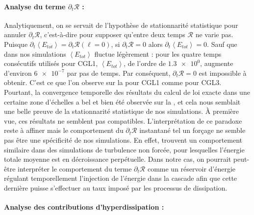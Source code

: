  \paragraph{Analyse du terme \ensuremath{\partial_t \mathcal{R}} :  } 
  Analytiquement, on se servait de l'hypothèse de stationnarité statistique pour annuler $\partial_t \mathcal{R}$, c'est-à-dire pour supposer qu'entre deux temps $\mathcal{R}$ ne varie pas. Puisque $\partial_t \left<E_{tot}\right>=\partial_t \mathcal{R}(\boldsymbol{\ell} = 0)$, si $\partial_t \mathcal{R}=0$ alors $\partial_t \left<E_{tot}\right>=0$.  Sauf que dans nos simulations $\left<E_{tot}\right>$ fluctue légèrement : pour les quatre temps consécutifs utilisés pour CGL1, $\left<E_{tot}\right>$, de l'ordre de $\num{1.3e0}$, augmente d'environ $\num{6e-7}$ par pas de temps. Par conséquent, $\partial_t \mathcal{R}=0$ est impossible à obtenir. C'est ce que l'on observe sur la  pour CGL1 comme pour CGL3. Pourtant, la convergence temporelle des résultats du calcul de loi exacte  dans une certaine zone d'échelles a bel et bien été observée sur la , et cela nous semblait une belle preuve de la stationnarité statistique de nos simulations. À première vue, ces résultats ne semblent pas compatibles. L'interprétation de ce paradoxe reste à affiner mais le comportement du $\partial_t \mathcal{R}$ instantané tel un forçage ne semble pas être une spécificité de nos simulations. En effet, \cite{ferrand_-depth_2022} trouvent un comportement similaire dans des simulations de turbulence non forcée, pour lesquelles l'énergie totale moyenne est en  décroissance perpétuelle. Dans notre cas, on pourrait peut-être interpréter le comportement du terme $\partial_t \mathcal{R}$ comme un réservoir d'énergie régulant temporellement l'injection de l'énergie dans la cascade afin que cette dernière puisse s'effectuer au taux imposé par les processus de dissipation. 
 
  \paragraph{Analyse des contributions d'hyperdissipation :  } 
  
